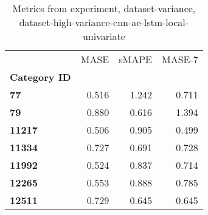 \begin{table}[h]
\centering
\caption{Metrics from experiment, dataset-variance, dataset-high-variance-cnn-ae-lstm-local-univariate}
\label{table:dataset-high-variance-cnn-ae-lstm-local-univariate-dataset-variance}
\begin{tabular}{lrrr}
\toprule
{} &   MASE &  sMAPE &  MASE-7 \\
\textbf{Category ID} &        &        &         \\
\midrule
\textbf{77         } &  0.516 &  1.242 &   0.711 \\
\textbf{79         } &  0.880 &  0.616 &   1.394 \\
\textbf{11217      } &  0.506 &  0.905 &   0.499 \\
\textbf{11334      } &  0.727 &  0.691 &   0.728 \\
\textbf{11992      } &  0.524 &  0.837 &   0.714 \\
\textbf{12265      } &  0.553 &  0.888 &   0.785 \\
\textbf{12511      } &  0.729 &  0.645 &   0.645 \\
\bottomrule
\end{tabular}
\end{table}
